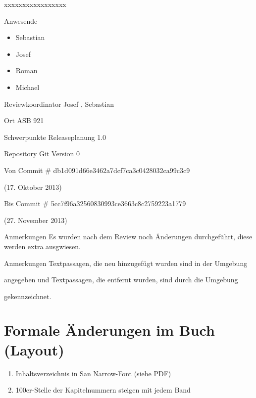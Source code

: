 \documentclass[
ngerman,
paper=a4,
asymmetric,
fontsize=10pt,
draft=false,
numbers=noenddot,
bibtotocnumbered,
footnotes=multiple,
]{scrreprt}
\newcommand{\jALT}{\vspace{6pt}\noindent{\color{red}\sffamily\textbf{DELETED}\hrulefill\newline}}
\newcommand{\jALTende}{\newline{\color{red}\rule{\linewidth}{2pt}\newline}}
\newcommand{\jNEU}{\vspace{6pt}\noindent{\color{green}\sffamily\textbf{ADDED}\hrulefill\newline}}
\newcommand{\jNEUende}{\newline{\color{green}\rule{\linewidth}{3pt}\newline}}
\begin{document}
\begin{labeling}[:]{xxxxxxxxxxxxxxxxx}
  \item[Anwesende] ~
  \begin{itemize}
    \item Sebastian 
    \item Josef 
    \item Roman 
    \item Michael 
  \end{itemize}
  \item[Reviewkoordinator] Josef , Sebastian 
  \item[Ort] ASB 921
  \item[Schwerpunkte] Releaseplanung 1.0
  \item[Repository] Git Version 0
  \item[Von Commit \#] db1d091d66e3462a7dcf7ca3c0428032ca99c3c9
  
  (17. Oktober 2013)
  \item[Bis Commit \#] 5cc7f96a32560830993ce3663c8c2759223a1779
  
  (27. November 2013)
  \item[Anmerkungen] Es wurden nach dem Review noch Änderungen durchgeführt, diese werden extra ausgwiesen.
  \item[Anmerkungen] Textpassagen, die neu hinzugefügt wurden sind in der
  Umgebung
  
  \jNEU
  \jNEUende
  
  angegeben und Textpassagen, die entfernt wurden, sind durch die Umgebung
  
  \jALT
  \jALTende
  
  gekennzeichnet.
  


\end{labeling}
\begin{WidePar}\small
\setcounter{tocdepth}{3}
\tableofcontents
\end{WidePar}


\chapter{Formale Änderungen im Buch (Layout)}
\begin{enumerate}
  \item Inhaltsverzeichnis in San Narrow-Font (siehe PDF)
  \item 100er-Stelle der Kapitelnummern steigen mit jedem Band
\end{enumerate}
\end{document}
